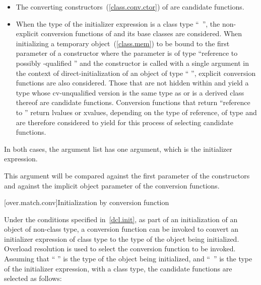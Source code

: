 \begin{itemize}
\item
The converting constructors~(\ref{class.conv.ctor}) of
are candidate functions.
\item
When the type of the initializer expression is a class type
``\cv{}~'',
the non-explicit conversion functions of
and its base classes are considered.
When initializing a temporary object~(\ref{class.mem})
to be bound to the first parameter of a constructor
where the parameter is of type
``reference to possibly \cv-qualified ''
and the constructor is
called with a single argument in the context of
direct-initialization of an object of type `` '', explicit
conversion functions are also considered.
Those that are not hidden within
and yield a type whose cv-unqualified version is the same type as
or is a derived class thereof
are candidate functions.
Conversion functions that return ``reference to
''
return
lvalues or xvalues, depending on the type of reference, of type
and are therefore considered to yield
for this
process of selecting candidate functions.
\end{itemize}

\pnum
In both cases, the argument list has one argument, which is the initializer
expression.
\begin{note}
This argument will be compared against
the first parameter of the constructors and against the implicit
object parameter of the conversion functions.
\end{note}

[over.match.conv]{Initialization by conversion function}%

\pnum
Under the conditions specified in~\ref{dcl.init}, as
part of an initialization of an object of non-class type,
a conversion function can be invoked to convert an initializer
expression of class type to the type of the object
being initialized.
Overload resolution is used to select the
conversion function to be invoked.
Assuming that `` '' is the
type of the object being initialized, and ``\cv{}~'' is the type
of the initializer expression, with
a class type,
the candidate functions are selected as follows:

